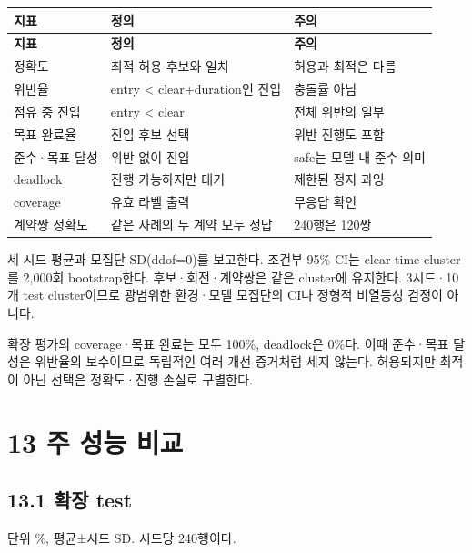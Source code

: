 \documentclass[11pt,a4paper]{article}
\begin{document}
\begingroup\small
\begin{longtable}{@{}>{\raggedright\arraybackslash}p{}>{\raggedright\arraybackslash}p{}>{\raggedright\arraybackslash}p{}@{}}
\toprule
\textbf{지표} & \textbf{정의} & \textbf{주의} \\
\midrule\endfirsthead
\toprule
\textbf{지표} & \textbf{정의} & \textbf{주의} \\
\midrule\endhead
\bottomrule\endfoot
정확도 & 최적 허용 후보와 일치 & 허용과 최적은 다름 \\
위반율 & entry < clear+duration인 진입 & 충돌률 아님 \\
점유 중 진입 & entry < clear & 전체 위반의 일부 \\
목표 완료율 & 진입 후보 선택 & 위반 진행도 포함 \\
준수·목표 달성 & 위반 없이 진입 & safe는 모델 내 준수 의미 \\
deadlock & 진행 가능하지만 대기 & 제한된 정지 과잉 \\
coverage & 유효 라벨 출력 & 무응답 확인 \\
계약쌍 정확도 & 같은 사례의 두 계약 모두 정답 & 240행은 120쌍 \\
\end{longtable}
\endgroup

세 시드 평균과 모집단 SD(ddof=0)를 보고한다. 조건부 95\% CI는 clear-time cluster를 2,000회 bootstrap한다. 후보·회전·계약쌍은 같은 cluster에 유지한다. 3시드·10개 test cluster이므로 광범위한 환경·모델 모집단의 CI나 정형적 비열등성 검정이 아니다.\par

확장 평가의 coverage·목표 완료는 모두 100\%, deadlock은 0\%다. 이때 준수·목표 달성은 위반율의 보수이므로 독립적인 여러 개선 증거처럼 세지 않는다. 허용되지만 최적이 아닌 선택은 정확도·진행 손실로 구별한다.\par

\clearpage{}\section*{13 주 성능 비교}

\subsection*{13.1 확장 test}

단위 \%, 평균±시드 SD. 시드당 240행이다.\par
\end{document}
